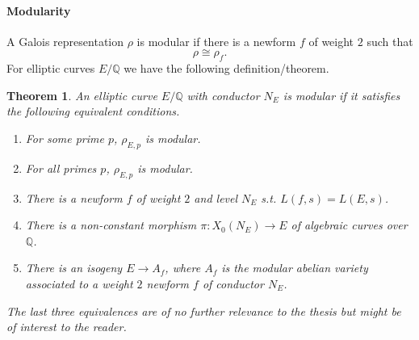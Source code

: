 \documentclass{article}
\theoremstyle{plain}%
\newtheorem{theorem}{Theorem}[section]
\theoremstyle{definition}
\theoremstyle{remark}
\begin{document}
\paragraph{Modularity}
A Galois representation \(\rho\) is modular if there is a newform \(f\) of weight \(2\) such that
\[
    \rho \cong \rho_f. 
\]
For elliptic curves \(E/\mathbb{Q}\) we have the following definition/theorem.
\begin{theorem}\cite[chapter 1, theorem 5.1]{Cornell1997}\label{th:eqcondmodularity}
    An elliptic curve \(E/\mathbb{Q}\) with conductor \(N_E\) is modular if it satisfies the following equivalent conditions.
    \begin{enumerate}
        \item For some prime \(p\), \(\rho_{E,p}\) is modular.
        \item For all primes \(p\), \(\rho_{E,p}\) is modular.
        \item There is a newform \(f\) of weight \(2\) and level \(N_E\) s.t. \(L(f, s) = L(E, s)\).
        \item There is a non-constant morphism \(\pi\colon X_0(N_E) \to E\) of algebraic curves over \(\mathbb{Q}\).
        \item There is an isogeny \(E \to A_f\), where \(A_f\) is the modular abelian variety associated to a
        weight \(2\) newform \(f\) of conductor \(N_E\).
    \end{enumerate}
    The last three equivalences are of no further relevance to the thesis but might be of interest to the reader.
\end{theorem}
\end{document}
